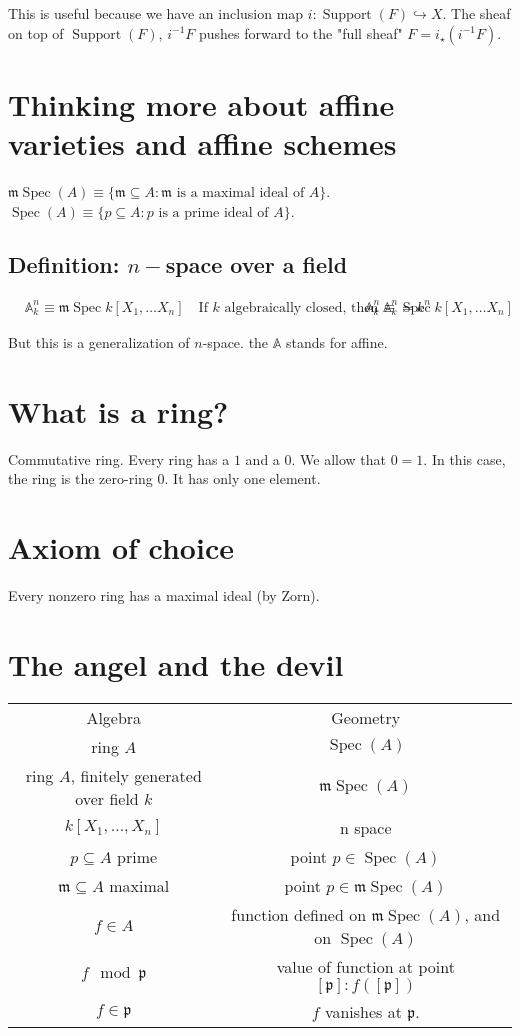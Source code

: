 \documentclass{book}
\newcommand{\A}{\ensuremath{\mathbb{A}}}
\newcommand{\spec}{\operatorname{Spec}}
\newcommand{\m}{\mathfrak{m}}
\newcommand{\p}{\mathfrak{p}}
\newcommand{\mspec}{\m\operatorname{Spec}}
\newcommand{\supp}{\operatorname{Support}}
\theoremstyle{definition}
\begin{document}
This is useful because we have an inclusion map $i: \supp(F) \hookrightarrow X$.
The sheaf on top of $\supp(F)$, $i^{-1} F$  pushes forward to the "full sheaf"
$F = i_\star (i^{-1} F)$.

\section{Thinking more about affine varieties and affine schemes}

$\mspec(A) \equiv \{ \m  \subseteq A : \m \text{ is a maximal ideal of } A \}$.
$\spec(A) \equiv \{ p \subseteq A : p \text{ is a prime ideal of } A \}$.

\subsection{Definition: $n-$space over a field}
\begin{align*}
    &\A^n_k \equiv \mspec k[X_1, \dots X_n] \quad \text{If $k$ algebraically closed, then $\A^n_k = k^n$}
    &\A^n_k \equiv \spec k[X_1, \dots X_n]
\end{align*}

But this is a generalization of $n$-space. the $\A$ stands for affine.

\section{What is a ring?}
Commutative ring. Every ring has a $1$ and a $0$. We allow that $0 = 1$.
In this case, the ring is the zero-ring $0$. It has only one element.

\section{Axiom of choice}
Every nonzero ring has a maximal ideal (by Zorn).

\section{The angel and the devil}

\begin{tabular}{cc}
    Algebra & Geometry \\
    ring $A$ & $\spec(A)$ \\
    ring $A$, finitely generated over field $k$ & $\mspec(A)$ \\
    $k[X_1, \dots, X_n]$ & n space \\
    $p \subseteq A$ prime & point $p \in \spec(A)$ \\
    \(\m \subseteq A\) maximal & point \(p \in \mspec(A)\) \\
    $f \in A$ &  function defined on $\mspec(A)$, and on $\spec(A)$ \\
    $f \mod \p$ &  value of function  at point $[\p]: f([\p])$ \\
    $f \in \p$ &  $f$ vanishes at $\p$.
\end{tabular}
\end{document}
